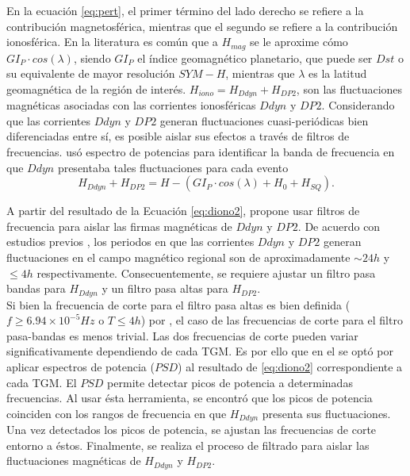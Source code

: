 \documentclass[preprint,12pt]{article}
\begin{document}
En la ecuación \ref{eq:pert}, el primer término del lado derecho se refiere a la contribución magnetosférica, mientras que el segundo se refiere a la contribución ionosférica. En la literatura es común que a $H_{mag}$ se le aproxime cómo $GI_P \cdot cos(\lambda)$, siendo $GI_P$ el índice geomagnético planetario, que puede ser $Dst$ o su equivalente de mayor resolución $SYM-H$, mientras que $\lambda$ es la latitud geomagnética de la región de interés. $H_{iono} = H_{Ddyn}+H_{DP2}$, son las fluctuaciones magnéticas asociadas con las corrientes ionosféricas $Ddyn$ y $DP2$. Considerando que las corrientes $Ddyn$ y $DP2$ generan fluctuaciones cuasi-periódicas bien diferenciadas entre sí, es posible aislar sus efectos a través de filtros de frecuencias. \cite{CASTELLANOSVELAZCO2024106237} usó espectro de potencias para identificar la banda de frecuencia en que $Ddyn$ presentaba tales fluctuaciones para cada evento\\

\begin{equation}
	\label{eq:diono2}
	H_{Ddyn}+H_{DP2} = H-(GI_P \cdot cos(\lambda)+H_0+H_{SQ}).
\end{equation}

A partir del resultado de la Ecuación \ref{eq:diono2}, \cite{amory2020_filtros} propone usar filtros de frecuencia para aislar las firmas magnéticas de $Ddyn$ y $DP2$. De acuerdo con estudios previos \citep{nishida_68_fluctuations, blanc_ddyn}, los periodos en que las corrientes $Ddyn$ y $DP2$  generan fluctuaciones en el campo magnético regional son de aproximadamente $\sim 24 h$ y $\leq 4h$ respectivamente. Consecuentemente, se requiere ajustar un filtro pasa bandas para $H_{Ddyn}$ y un filtro pasa altas para $H_{DP2}$.\\


Si bien la frecuencia de corte para el filtro pasa altas es bien definida ($f \geq 6.94 \times 10 ^{-5} Hz$ o $T \leq 4 h$) por \cite{nishida_68_fluctuations}, el caso de las frecuencias de corte para el filtro pasa-bandas es menos trivial. Las dos frecuencias de corte pueden variar significativamente dependiendo de cada TGM. Es por ello que en el \cite{CASTELLANOSVELAZCO2024106237} se optó por aplicar espectros de potencia ($PSD$) al resultado de \ref{eq:diono2} correspondiente a cada TGM. El $PSD$ permite detectar picos de potencia a determinadas frecuencias. Al usar ésta herramienta, se encontró que los picos de potencia coinciden con los rangos de frecuencia en que $H_{Ddyn}$ presenta sus fluctuaciones. Una vez detectados los picos de potencia, se ajustan las frecuencias de corte entorno a éstos. Finalmente, se realiza el proceso de filtrado para aislar las fluctuaciones magnéticas de $H_{Ddyn}$ y $H_{DP2}$.\\
\end{document}
